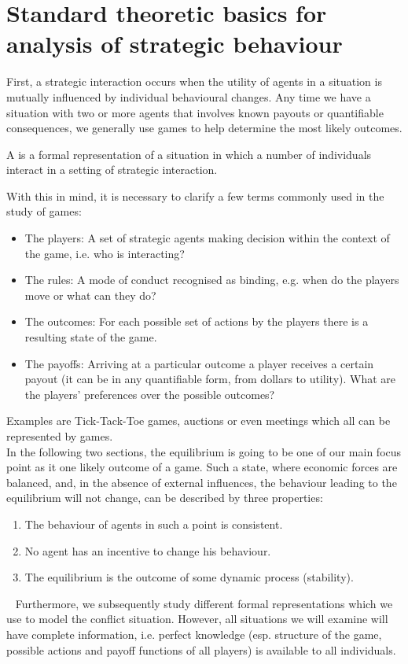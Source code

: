 

\chapter{Standard theoretic basics for analysis of strategic behaviour}

First, a strategic interaction occurs when the utility of agents in a situation is mutually influenced by individual behavioural changes. Any time we have a situation with two or more agents that involves known payouts or quantifiable consequences, we generally use games to help determine the most likely outcomes. 

	A  is a formal representation of a situation in which a number of individuals interact in a setting of strategic interaction. 

	With this in mind, it is necessary to clarify a few terms commonly used in the study of games:
	\begin{itemize}
		\item The players: A set of strategic agents making decision within the context of the game, i.e. who is interacting?	
		\item The rules: A mode of conduct recognised as binding, e.g. when do the players move or what can they do?
		\item The outcomes: For each possible set of actions by the players there is a resulting state of the game.
		\item The payoffs: Arriving at a particular outcome a player receives a certain payout (it can be in any quantifiable form, from dollars to utility). What are the players' preferences over the possible outcomes? 
	\end{itemize}

Examples are Tick-Tack-Toe games, auctions or even meetings which all can be represented by games. \\

In the following two sections, the equilibrium is going to be one of our main focus point as it one likely outcome of a game. Such a state, where economic forces are balanced, and, in the absence of external influences, the behaviour leading to the equilibrium will not change, can be described by three properties: 
\begin{enumerate}
	\item The behaviour of agents in such a point is consistent.
	\item No agent has an incentive to change his behaviour.
	\item The equilibrium is the outcome of some dynamic process (stability).
\end{enumerate}

~\newline
Furthermore, we subsequently study different formal representations which we use to model the conflict situation. However, all situations we will examine will have complete information, i.e. perfect knowledge (esp. structure of the game, possible actions and payoff functions of all players) is available to all individuals. 


\newpage